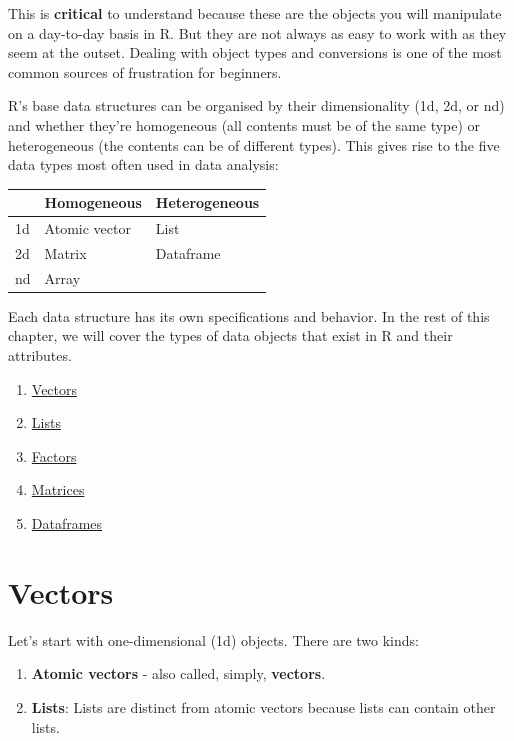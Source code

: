 \documentclass[]{book}
\providecommand{\tightlist}{%
  \setlength{\itemsep}{0pt}\setlength{\parskip}{0pt}}
\begin{document}
This is \textbf{critical} to understand because these are the objects
you will manipulate on a day-to-day basis in R. But they are not always
as easy to work with as they seem at the outset. Dealing with object
types and conversions is one of the most common sources of frustration
for beginners.

R's base data structures can be organised by their dimensionality (1d,
2d, or nd) and whether they're homogeneous (all contents must be of the
same type) or heterogeneous (the contents can be of different types).
This gives rise to the five data types most often used in data analysis:

\begin{longtable}[]{@{}lll@{}}
\toprule
& Homogeneous & Heterogeneous\tabularnewline
\midrule
\endhead
1d & Atomic vector & List\tabularnewline
2d & Matrix & Dataframe\tabularnewline
nd & Array &\tabularnewline
\bottomrule
\end{longtable}

Each data structure has its own specifications and behavior. In the rest
of this chapter, we will cover the types of data objects that exist in R
and their attributes.

\begin{enumerate}
\def\labelenumi{\arabic{enumi}.}
\tightlist
\item
  \protect\hyperlink{vectors}{Vectors}
\item
  \protect\hyperlink{lists}{Lists}
\item
  \protect\hyperlink{factors}{Factors}
\item
  \protect\hyperlink{matrices}{Matrices}
\item
  \protect\hyperlink{dataframes}{Dataframes}
\end{enumerate}

\hypertarget{vectors}{\section{Vectors}\label{vectors}}

Let's start with one-dimensional (1d) objects. There are two kinds:

\begin{enumerate}
\def\labelenumi{\arabic{enumi}.}
\tightlist
\item
  \textbf{Atomic vectors} - also called, simply, \textbf{vectors}.
\item
  \textbf{Lists}: Lists are distinct from atomic vectors because lists
  can contain other lists.
\end{enumerate}
\end{document}
